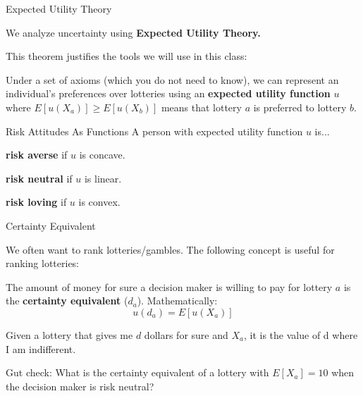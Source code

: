 \documentclass[aspectratio=169,usenames,dvipsnames]{beamer}
\newenvironment{wideitemize}{\itemize\addtolength{\itemsep}{10pt}}{\enditemize}
\begin{document}
\begin{frame}{Expected Utility Theory}
 \begin{wideitemize}
     \item We analyze uncertainty using \textbf{Expected Utility Theory.}
     \item This theorem justifies the tools we will use in this class:
    
     \begin{theorem}
Under a set of axioms (which you do not need to know), we can represent an individual's preferences over lotteries using an \textbf{expected utility function} $u$ where $E[u(X_a)] \geq E[u(X_b)]$ means that lottery $a$ is preferred to lottery $b$.
\end{theorem}

 \end{wideitemize}
 \end{frame}

\begin{frame}{Risk Attitudes As Functions}
A person with expected utility function $u$ is...
\begin{wideitemize}
    \item \textbf{risk averse} if $u$ is concave.
    \item \textbf{risk neutral} if $u$ is linear.
    \item \textbf{risk loving} if $u$ is convex.
\end{wideitemize}

\end{frame}

\begin{frame}{Certainty Equivalent}

\begin{wideitemize}
    \item We often want to rank lotteries/gambles. The following concept is useful for ranking lotteries:
    \begin{definition}
    The amount of money for sure a decision maker is willing to pay for lottery $a$ is the \textbf{certainty equivalent} ($d_a$). Mathematically:
    \[u(d_a) = E[u(X_a)]\]
    \end{definition}
    \item Given a lottery that gives me $d$ dollars for sure and $X_a$, it is the value of d where I am indifferent.
    \pause \item Gut check: What is the certainty equivalent of a lottery with $E[X_a]=10$ when the decision maker is risk neutral?
\end{wideitemize}
\end{frame}
\end{document}
